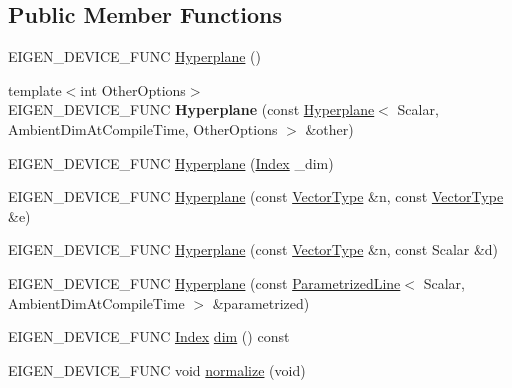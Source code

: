 \subsection*{Public Member Functions}
\begin{DoxyCompactItemize}
\item 
E\+I\+G\+E\+N\+\_\+\+D\+E\+V\+I\+C\+E\+\_\+\+F\+U\+NC \mbox{\hyperlink{class_eigen_1_1_hyperplane_a98d2a770332eec864a897a8ef5bb6025}{Hyperplane}} ()
\item 
\mbox{\label{class_eigen_1_1_hyperplane_a58fb83b9f2803be5f11fe13f4d37bf23}} 
{\footnotesize template$<$int Other\+Options$>$ }\\E\+I\+G\+E\+N\+\_\+\+D\+E\+V\+I\+C\+E\+\_\+\+F\+U\+NC {\bfseries Hyperplane} (const \mbox{\hyperlink{class_eigen_1_1_hyperplane}{Hyperplane}}$<$ Scalar, Ambient\+Dim\+At\+Compile\+Time, Other\+Options $>$ \&other)
\item 
E\+I\+G\+E\+N\+\_\+\+D\+E\+V\+I\+C\+E\+\_\+\+F\+U\+NC \mbox{\hyperlink{class_eigen_1_1_hyperplane_a9d99b8b94daa237d51e078e85fe02e2b}{Hyperplane}} (\mbox{\hyperlink{class_eigen_1_1_hyperplane_a58d2307d16128a0026021374e9e10465}{Index}} \+\_\+dim)
\item 
E\+I\+G\+E\+N\+\_\+\+D\+E\+V\+I\+C\+E\+\_\+\+F\+U\+NC \mbox{\hyperlink{class_eigen_1_1_hyperplane_a4ffbf274b428ed80ccb1041db753df74}{Hyperplane}} (const \mbox{\hyperlink{class_eigen_1_1_matrix}{Vector\+Type}} \&n, const \mbox{\hyperlink{class_eigen_1_1_matrix}{Vector\+Type}} \&e)
\item 
E\+I\+G\+E\+N\+\_\+\+D\+E\+V\+I\+C\+E\+\_\+\+F\+U\+NC \mbox{\hyperlink{class_eigen_1_1_hyperplane_a1375e9d62e54a5ada49b6367ee2eaa8d}{Hyperplane}} (const \mbox{\hyperlink{class_eigen_1_1_matrix}{Vector\+Type}} \&n, const Scalar \&d)
\item 
E\+I\+G\+E\+N\+\_\+\+D\+E\+V\+I\+C\+E\+\_\+\+F\+U\+NC \mbox{\hyperlink{class_eigen_1_1_hyperplane_ab0096b58dd2a7d4e5c5d66e824c3b657}{Hyperplane}} (const \mbox{\hyperlink{class_eigen_1_1_parametrized_line}{Parametrized\+Line}}$<$ Scalar, Ambient\+Dim\+At\+Compile\+Time $>$ \&parametrized)
\item 
E\+I\+G\+E\+N\+\_\+\+D\+E\+V\+I\+C\+E\+\_\+\+F\+U\+NC \mbox{\hyperlink{class_eigen_1_1_hyperplane_a58d2307d16128a0026021374e9e10465}{Index}} \mbox{\hyperlink{class_eigen_1_1_hyperplane_a44f0dab75a838cdadf1df9150648b8ed}{dim}} () const
\item 
E\+I\+G\+E\+N\+\_\+\+D\+E\+V\+I\+C\+E\+\_\+\+F\+U\+NC void \mbox{\hyperlink{class_eigen_1_1_hyperplane_ac12d2a82db8f058f01b2de92d55a65e6}{normalize}} (void)

\end{DoxyCompactItemize}
